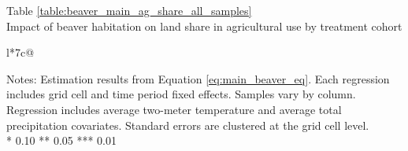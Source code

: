 \begin{table}[t]
\captionlistentry[table]{}
\label{table:beaver_main_ag_share_all_samples}
\centering
Table \ref{table:beaver_main_ag_share_all_samples} \\
Impact of beaver habitation on land share in agricultural use by treatment cohort \\
\vspace{0.5em}
\begin{threeparttable}
\begin{tabulary}{\textwidth}{l*{7}{c}@{}}
\toprule \toprule
\noalign{\smallskip}
\noalign{\smallskip}
\midrule \bottomrule
\end{tabulary}
\medskip
\begin{tablenotes}[flushleft]
\setlength{}
\item
\footnotesize
\justify
Notes: Estimation results from Equation \eqref{eq:main_beaver_eq}.
Each regression includes grid cell and time period fixed effects.
Samples vary by column. Regression includes average two-meter temperature and average total precipitation covariates.
Standard errors are clustered at the grid cell level.  \\
\mbox{*} 0.10 ** 0.05 *** 0.01
\end{tablenotes}
\end{threeparttable}
\end{table}
